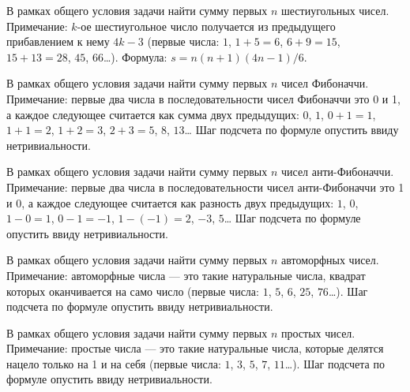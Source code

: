 
\begin{zztask}
В рамках общего условия задачи найти сумму первых $n$ шестиугольных чисел.
Примечание: $k$-ое шестиугольное число получается из предыдущего прибавлением
к нему $4k-3$ (первые числа: $1$, $1+5=6$, $6+9=15$, $15+13=28$, $45$, $66$\dots).
Формула: $s = n(n+1)(4n-1)/6$.
\end{zztask}


\begin{zztask}
В рамках общего условия задачи найти сумму первых $n$ чисел Фибоначчи.
Примечание: первые
два числа в последовательности чисел Фибоначчи это 0 и 1, а каждое следующее
считается как сумма двух предыдущих: $0$, $1$, $0+1=1$, $1+1=2$, $1+2=3$, $2+3=5$,
$8$, $13$\dots
Шаг подсчета по формуле опустить ввиду нетривиальности.
\end{zztask}


\begin{zztask}
В рамках общего условия задачи найти сумму первых $n$ чисел анти-Фибоначчи.
Примечание: первые
два числа в последовательности чисел анти-Фибоначчи это 1 и 0, а каждое
следующее считается как разность двух предыдущих: $1$, $0$, $1-0=1$, $0-1=-1$,
$1-(-1)=2$, $-3$, $5$\dots
Шаг подсчета по формуле опустить ввиду нетривиальности.
\end{zztask}


\begin{zztask}
В рамках общего условия задачи найти сумму первых $n$ автоморфных чисел.
Примечание:
автоморфные числа --- это такие натуральные числа, квадрат которых
оканчивается на само число (первые числа: $1$, $5$, $6$, $25$, $76$\dots).
Шаг подсчета по формуле опустить ввиду нетривиальности.  
\end{zztask}


\begin{zztask}
В рамках общего условия задачи найти сумму первых $n$ простых чисел.
Примечание: простые
числа --- это такие натуральные числа, которые делятся нацело только на 1 и
на себя (первые числа: $1$, $3$, $5$, $7$, $11$\dots).
Шаг подсчета по формуле опустить ввиду нетривиальности.
\end{zztask}

